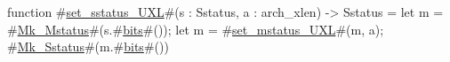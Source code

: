function #\hyperref[sailRISCVzsetzysstatuszyUXL]{set\_sstatus\_UXL}#(s : Sstatus, a : arch_xlen) -> Sstatus = {
  let m = #\hyperref[sailRISCVzMkzyMstatus]{Mk\_Mstatus}#(s.#\hyperref[sailRISCVzbits]{bits}#());
  let m = #\hyperref[sailRISCVzsetzymstatuszyUXL]{set\_mstatus\_UXL}#(m, a);
  #\hyperref[sailRISCVzMkzySstatus]{Mk\_Sstatus}#(m.#\hyperref[sailRISCVzbits]{bits}#())
}
